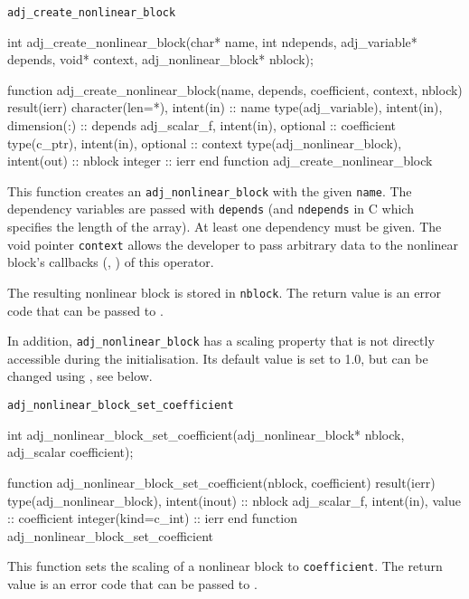 \begin{boxwithtitle}{\texttt{adj_create_nonlinear_block}}
\begin{minipage}{\columnwidth}
\begin{ccode}
  int adj_create_nonlinear_block(char* name, int ndepends, adj_variable* depends, 
                                 void* context, adj_nonlinear_block* nblock);
\end{ccode}
\begin{fortrancode}
  function adj_create_nonlinear_block(name, depends, coefficient, context, nblock) 
           result(ierr)
    character(len=*), intent(in) :: name
    type(adj_variable), intent(in), dimension(:) :: depends
    adj_scalar_f, intent(in), optional :: coefficient
    type(c_ptr), intent(in), optional :: context
    type(adj_nonlinear_block), intent(out) :: nblock
    integer :: ierr
  end function adj_create_nonlinear_block
\end{fortrancode}
\end{minipage}
\end{boxwithtitle}
This function creates an \texttt{adj_nonlinear_block} with the given \texttt{name}.
The dependency variables are passed with \texttt{depends} (and \texttt{ndepends} in C which specifies the length of the array).
At least one dependency must be given.
The void pointer \texttt{context} allows the developer to pass arbitrary data to the nonlinear block's callbacks (, ) of this operator.

The resulting nonlinear block is stored in \texttt{nblock}. 
The return value is an error code that can be passed to .

In addition, \texttt{adj_nonlinear_block} has a scaling property that is not directly accessible during the initialisation. 
Its default value is set to 1.0, but can be changed using , see below.


\begin{boxwithtitle}{\texttt{adj_nonlinear_block_set_coefficient}}
\begin{minipage}{\columnwidth}
\begin{ccode}
  int adj_nonlinear_block_set_coefficient(adj_nonlinear_block* nblock, 
                                          adj_scalar coefficient);
\end{ccode}
\begin{fortrancode}
  function adj_nonlinear_block_set_coefficient(nblock, coefficient) result(ierr) 
    type(adj_nonlinear_block), intent(inout) :: nblock
    adj_scalar_f, intent(in), value :: coefficient
    integer(kind=c_int) :: ierr
  end function adj_nonlinear_block_set_coefficient
\end{fortrancode}
\end{minipage}
\end{boxwithtitle}
This function sets the scaling of a nonlinear block to \texttt{coefficient}. 
The return value is an error code that can be passed to .


